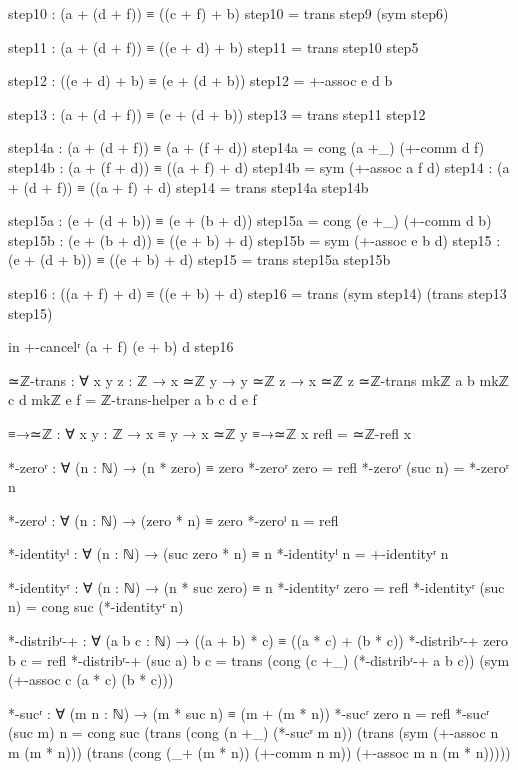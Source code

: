 \documentclass[11pt,a4paper]{book}
\begin{document}
\begin{code}
    step10 : (a + (d + f)) ≡ ((c + f) + b)
    step10 = trans step9 (sym step6)
    
    step11 : (a + (d + f)) ≡ ((e + d) + b)
    step11 = trans step10 step5
    
    step12 : ((e + d) + b) ≡ (e + (d + b))
    step12 = +-assoc e d b
    
    step13 : (a + (d + f)) ≡ (e + (d + b))
    step13 = trans step11 step12
    

    step14a : (a + (d + f)) ≡ (a + (f + d))
    step14a = cong (a +_) (+-comm d f)
    step14b : (a + (f + d)) ≡ ((a + f) + d)
    step14b = sym (+-assoc a f d)
    step14 : (a + (d + f)) ≡ ((a + f) + d)
    step14 = trans step14a step14b
    
    step15a : (e + (d + b)) ≡ (e + (b + d))
    step15a = cong (e +_) (+-comm d b)
    step15b : (e + (b + d)) ≡ ((e + b) + d)
    step15b = sym (+-assoc e b d)
    step15 : (e + (d + b)) ≡ ((e + b) + d)
    step15 = trans step15a step15b
    
    step16 : ((a + f) + d) ≡ ((e + b) + d)
    step16 = trans (sym step14) (trans step13 step15)
    
  in +-cancelʳ (a + f) (e + b) d step16

≃ℤ-trans : ∀ {x y z : ℤ} → x ≃ℤ y → y ≃ℤ z → x ≃ℤ z
≃ℤ-trans {mkℤ a b} {mkℤ c d} {mkℤ e f} = ℤ-trans-helper a b c d e f

≡→≃ℤ : ∀ {x y : ℤ} → x ≡ y → x ≃ℤ y
≡→≃ℤ {x} refl = ≃ℤ-refl x

*-zeroʳ : ∀ (n : ℕ) → (n * zero) ≡ zero
*-zeroʳ zero    = refl
*-zeroʳ (suc n) = *-zeroʳ n

*-zeroˡ : ∀ (n : ℕ) → (zero * n) ≡ zero
*-zeroˡ n = refl

*-identityˡ : ∀ (n : ℕ) → (suc zero * n) ≡ n
*-identityˡ n = +-identityʳ n

*-identityʳ : ∀ (n : ℕ) → (n * suc zero) ≡ n
*-identityʳ zero = refl
*-identityʳ (suc n) = cong suc (*-identityʳ n)

*-distribʳ-+ : ∀ (a b c : ℕ) → ((a + b) * c) ≡ ((a * c) + (b * c))
*-distribʳ-+ zero    b c = refl
*-distribʳ-+ (suc a) b c = 
  trans (cong (c +_) (*-distribʳ-+ a b c)) 
        (sym (+-assoc c (a * c) (b * c)))

*-sucʳ : ∀ (m n : ℕ) → (m * suc n) ≡ (m + (m * n))
*-sucʳ zero    n = refl
*-sucʳ (suc m) n = cong suc (trans (cong (n +_) (*-sucʳ m n))
                     (trans (sym (+-assoc n m (m * n)))
                     (trans (cong (_+ (m * n)) (+-comm n m))
                     (+-assoc m n (m * n)))))


\end{code}
\end{document}
